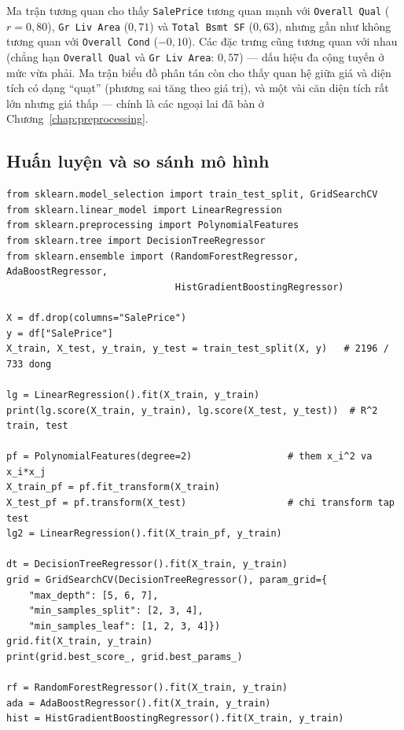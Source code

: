

Ma trận tương quan cho thấy \texttt{SalePrice} tương quan mạnh với \texttt{Overall Qual} ($r = 0{,}80$), \texttt{Gr Liv Area} ($0{,}71$) và \texttt{Total Bsmt SF} ($0{,}63$), nhưng gần như không tương quan với \texttt{Overall Cond} ($-0{,}10$). Các đặc trưng cũng tương quan với nhau (chẳng hạn \texttt{Overall Qual} và \texttt{Gr Liv Area}: $0{,}57$) --- dấu hiệu đa cộng tuyến ở mức vừa phải. Ma trận biểu đồ phân tán còn cho thấy quan hệ giữa giá và diện tích có dạng ``quạt'' (phương sai tăng theo giá trị), và một vài căn diện tích rất lớn nhưng giá thấp --- chính là các ngoại lai đã bàn ở Chương~\ref{chap:preprocessing}.

\subsection{Huấn luyện và so sánh mô hình}

\begin{lstlisting}[caption={Lab 1 -- huấn luyện các mô hình}]
from sklearn.model_selection import train_test_split, GridSearchCV
from sklearn.linear_model import LinearRegression
from sklearn.preprocessing import PolynomialFeatures
from sklearn.tree import DecisionTreeRegressor
from sklearn.ensemble import (RandomForestRegressor, AdaBoostRegressor,
                              HistGradientBoostingRegressor)

X = df.drop(columns="SalePrice")
y = df["SalePrice"]
X_train, X_test, y_train, y_test = train_test_split(X, y)   # 2196 / 733 dong

lg = LinearRegression().fit(X_train, y_train)
print(lg.score(X_train, y_train), lg.score(X_test, y_test))  # R^2 train, test

pf = PolynomialFeatures(degree=2)                 # them x_i^2 va x_i*x_j
X_train_pf = pf.fit_transform(X_train)
X_test_pf = pf.transform(X_test)                  # chi transform tap test
lg2 = LinearRegression().fit(X_train_pf, y_train)

dt = DecisionTreeRegressor().fit(X_train, y_train)
grid = GridSearchCV(DecisionTreeRegressor(), param_grid={
    "max_depth": [5, 6, 7],
    "min_samples_split": [2, 3, 4],
    "min_samples_leaf": [1, 2, 3, 4]})
grid.fit(X_train, y_train)
print(grid.best_score_, grid.best_params_)

rf = RandomForestRegressor().fit(X_train, y_train)
ada = AdaBoostRegressor().fit(X_train, y_train)
hist = HistGradientBoostingRegressor().fit(X_train, y_train)
\end{lstlisting}

